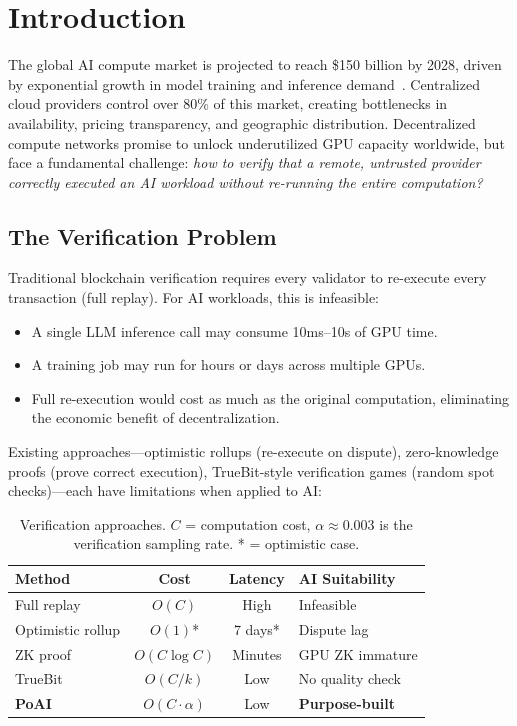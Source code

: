\section{Introduction}

\label{sec:intro}

The global AI compute market is projected to reach \$150 billion by 2028, driven by exponential growth in model training and inference demand~\cite{mckinseyai2024}. Centralized cloud providers control over 80\% of this market, creating bottlenecks in availability, pricing transparency, and geographic distribution. Decentralized compute networks promise to unlock underutilized GPU capacity worldwide, but face a fundamental challenge: \emph{how to verify that a remote, untrusted provider correctly executed an AI workload without re-running the entire computation?}

\subsection{The Verification Problem}

Traditional blockchain verification requires every validator to re-execute every transaction (full replay). For AI workloads, this is infeasible:

\begin{itemize}[leftmargin=1.1em]
    \item A single LLM inference call may consume 10ms--10s of GPU time.
    \item A training job may run for hours or days across multiple GPUs.
    \item Full re-execution would cost as much as the original computation, eliminating the economic benefit of decentralization.
\end{itemize}

Existing approaches---optimistic rollups (re-execute on dispute), zero-knowledge proofs (prove correct execution), TrueBit-style verification games (random spot checks)---each have limitations when applied to AI:

\begin{table}[H]
\centering
\small
\begin{tabular}{lccl}
\toprule
\textbf{Method} & \textbf{Cost} & \textbf{Latency} & \textbf{AI Suitability} \\
\midrule
Full replay & $O(C)$ & High & Infeasible \\
Optimistic rollup & $O(1)$* & 7 days* & Dispute lag \\
ZK proof & $O(C \log C)$ & Minutes & GPU ZK immature \\
TrueBit & $O(C/k)$ & Low & No quality check \\
\textbf{PoAI} & $O(C \cdot \alpha)$ & Low & \textbf{Purpose-built} \\
\bottomrule
\end{tabular}
\caption{Verification approaches. $C$ = computation cost, $\alpha \approx 0.003$ is the verification sampling rate. * = optimistic case.}
\label{tab:verification}
\end{table}

